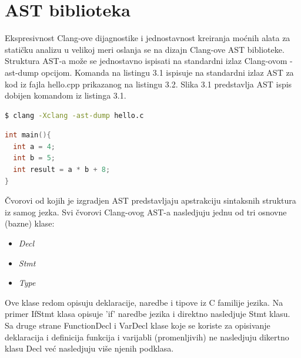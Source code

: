 \documentclass[12pt,oneside]{memoir}
\begin{document}
\section{AST biblioteka}

Ekspresivnost Clang-ove dijagnostike i jednostavnost kreiranja mo\'{c}nih alata za stati\v{c}ku analizu u velikoj meri oslanja se na dizajn Clang-ove AST biblioteke. Struktura AST-a mo\v{z}e  se jednostavno ispisati na standardni izlaz Clang-ovom -ast-dump opcijom. Komanda na listingu 3.1 ispisuje na standardni izlaz AST za kod iz fajla hello.cpp prikazanog na listingu 3.2. Slika 3.1 predstavlja AST ispis dobijen komandom iz listinga 3.1.
\\

\begin{lstlisting}[caption={Komanda za ispisivanje Clang-ovog AST-a},label={lst:label},language=bash, captionpos=b]
$ clang -Xclang -ast-dump hello.c
\end{lstlisting}

\begin{lstlisting}[caption={Kod \v{c}iji je AST prikazan na slici 3.1},label={lst:label},language=C++, captionpos=b]
int main(){
  int a = 4;
  int b = 5;
  int result = a * b + 8;
}
\end{lstlisting}

\v{C}vorovi od kojih je izgradjen AST predstavljaju apstrakciju sintaksnih struktura iz samog jezka.
Svi \v{c}vorovi Clang-ovog AST-a nasledjuju jednu od tri osnovne (bazne) klase:
\begin{itemize}
  \item \textit{Decl}
  \item \textit{Stmt}
  \item \textit{Type}
\end{itemize}
Ove klase redom opisuju deklaracije, naredbe i tipove iz C familije jezika.
Na primer IfStmt klasa opisuje 'if' naredbe jezika i direktno nasledjuje Stmt klasu. Sa druge strane FunctionDecl i VarDecl klase koje se koriste za opisivanje
deklaracija i definicija funkcija i varijabli (promenljivih) ne nasledjuju dikertno klasu Decl ve\'{c} nasledjuju vi\v{s}e njenih podklasa.
\end{document}
